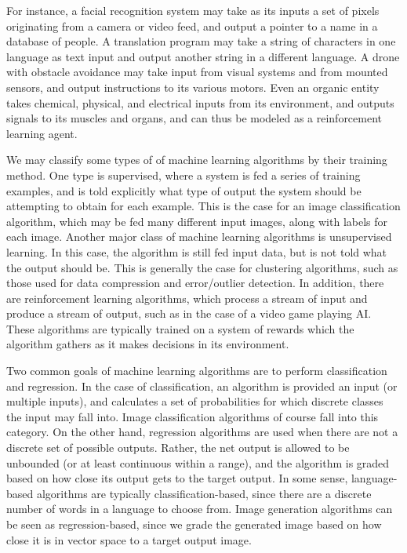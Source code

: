 For instance, a facial recognition system may take as its inputs a set of pixels originating from a camera or video feed, and output a pointer to a name in a database of people. A translation program may take a string of characters in one language as text input and output another string in a different language. A drone with obstacle avoidance may take input from visual systems and from mounted sensors, and output instructions to its various motors. Even an organic entity takes chemical, physical, and electrical inputs from its environment, and outputs signals to its muscles and organs, and can thus be modeled as a reinforcement learning agent.

We may classify some types of of machine learning algorithms by their training method. One type is supervised, where a system is fed a series of training examples, and is told explicitly what type of output the system should be attempting to obtain for each example. This is the case for an image classification algorithm, which may be fed many different input images, along with labels for each image. Another major class of machine learning algorithms is unsupervised learning. In this case, the algorithm is still fed input data, but is not told what the output should be. This is generally the case for clustering algorithms, such as those used for data compression and error/outlier detection. In addition, there are reinforcement learning algorithms, which process a stream of input and produce a stream of output, such as in the case of a video game playing AI. These algorithms are typically trained on a system of rewards which the algorithm gathers as it makes decisions in its environment.

Two common goals of machine learning algorithms are to perform classification and regression. In the case of classification, an algorithm is provided an input (or multiple inputs), and calculates a set of probabilities for which discrete classes the input may fall into. Image classification algorithms of course fall into this category. On the other hand, regression algorithms are used when there are not a discrete set of possible outputs. Rather, the net output is allowed to be unbounded (or at least continuous within a range), and the algorithm is graded based on how close its output gets to the target output. In some sense, language-based algorithms are typically classification-based, since there are a discrete number of words in a language to choose from. Image generation algorithms can be seen as regression-based, since we grade the generated image based on how close it is in vector space to a target output image.

